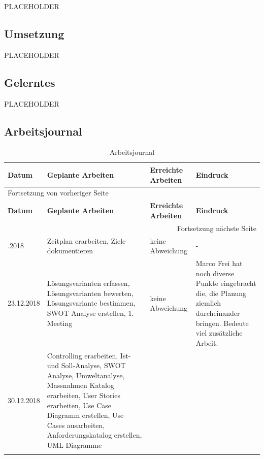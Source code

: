 PLACEHOLDER

\subsection{Umsetzung}
\label{sec:org0d3255b}

PLACEHOLDER

\subsection{Gelerntes}
\label{sec:org8f28034}

PLACEHOLDER

\newpage
\begin{landscape}
\section{Arbeitsjournal}
\label{sec:org64fdba0}

\begin{longtable}{|p{2cm}|p{5cm}|p{5cm}|p{7cm}|}
\hline
\textbf{Datum}\cellcolor[HTML]{C0C0C0} & \textbf{Geplante Arbeiten}\cellcolor[HTML]{C0C0C0} & \textbf{Erreichte Arbeiten}\cellcolor[HTML]{C0C0C0} & \textbf{Eindruck}\cellcolor[HTML]{C0C0C0}\\
\hline
\endfirsthead
\multicolumn{4}{l}{Fortsetzung von vorheriger Seite} \\
\hline

\textbf{Datum}\cellcolor[HTML]{C0C0C0} & \textbf{Geplante Arbeiten}\cellcolor[HTML]{C0C0C0} & \textbf{Erreichte Arbeiten}\cellcolor[HTML]{C0C0C0} & \textbf{Eindruck}\cellcolor[HTML]{C0C0C0} \\

\hline
\endhead
\hline\multicolumn{4}{r}{Fortsetzung nächste Seite} \\
\endfoot
\endlastfoot
\hline
16.12.2018 & Zeitplan erarbeiten, Ziele dokumentieren & keine Abweichung & -\\
\hline
23.12.2018 & Lösungsvarianten erfassen, Lösungsvarianten bewerten, Lösungsvariante bestimmen, SWOT Analyse erstellen, 1. Meeting & keine Abweichung & Marco Frei hat noch diverse Punkte eingebracht die, die Planung ziemlich durcheinander bringen. Bedeute viel zusätzliche Arbeit.\\
\hline
30.12.2018 & Controlling erarbeiten, Ist- und Soll-Analyse, SWOT Analyse, Umweltanalyse, Massnahmen Katalog erarbeiten, User Stories erarbeiten, Use Case Diagramm erstellen, Use Cases ausarbeiten, Anforderungskatalog erstellen, UML Diagramme &  & \\
\hline
\caption{\label{tab:org270babe}
Arbeitsjournal}
\\
\end{longtable}
\end{landscape}
